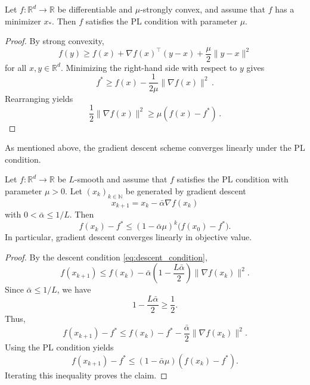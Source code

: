 \documentclass[12pt,openany]{book}
\theoremstyle{definition}
\theoremstyle{definition}
\newcommand{\N}{\mathbb{N}}
\newcommand{\R}{\mathbb{R}}
\begin{document}
\begin{prop}\label{prop:strongconvex_PL}
Let $f:\R^d\to\R$ be differentiable and $\mu$-strongly convex, and assume that $f$ has a
minimizer $x_\ast$. Then $f$ satisfies the PL condition with parameter $\mu$.
\end{prop}

\begin{proof}
By strong convexity,
\[
f(y)\geq f(x)+\nabla f(x)^\top(y-x)+\frac{\mu}{2}\|y-x\|^2
\]
for all $x,y\in\R^d$. Minimizing the right-hand side with respect to $y$ gives
\[
f^\ast
\geq
f(x)-\frac{1}{2\mu}\|\nabla f(x)\|^2\,.
\]
Rearranging yields
\[
\frac12\|\nabla f(x)\|^2\geq \mu(f(x)-f^\ast)\,.
\]
\end{proof}
As mentioned above, the gradient descent scheme converges linearly under the PL condition.
\begin{thm}\label{thm:GDPL}
Let $f:\R^d\to\R$ be $L$-smooth and assume that $f$ satisfies the PL condition with parameter
$\mu>0$. Let $(x_k)_{k\in\N}$ be generated by gradient descent
\[
x_{k+1}=x_k-\bar\alpha\nabla f(x_k)
\]
with $0<\bar\alpha\leq 1/L$. Then
\[
f(x_k)-f^\ast
\leq
(1-\bar\alpha\mu)^k\big(f(x_0)-f^\ast\big).
\]
In particular, gradient descent converges linearly in objective value.
\end{thm}
\begin{proof}
By the descent condition \eqref{eq:descent_condition},
\[
f(x_{k+1})
\leq
f(x_k)-\bar\alpha\left(1-\frac{L\bar\alpha}{2}\right)\|\nabla f(x_k)\|^2.
\]
Since $\bar\alpha\leq 1/L$, we have
\[
1-\frac{L\bar\alpha}{2}\geq \frac12.
\]
Thus,
\[
f(x_{k+1})-f^\ast
\leq
f(x_k)-f^\ast-\frac{\bar\alpha}{2}\|\nabla f(x_k)\|^2.
\]
Using the PL condition yields
\[
f(x_{k+1})-f^\ast
\leq
(1-\bar\alpha\mu)(f(x_k)-f^\ast).
\]
Iterating this inequality proves the claim.
\end{proof}
\end{document}

